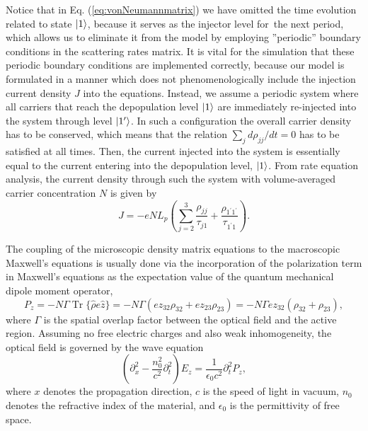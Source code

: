 \documentclass[10pt]{article}
\DeclareMathOperator{\Tr}{Tr}
\begin{document}
			Notice that in Eq. (\ref{eq:vonNeumannmatrix}) we have omitted the time
			evolution related to state $\Ket{1}$, because it serves as the injector level
			for\ the next period, which allows us to eliminate it from the model by
			employing ''periodic'' boundary conditions in the scattering rates matrix. It
			is vital for the simulation that these periodic boundary conditions are
			implemented correctly, because our model is formulated in a manner which does
			not phenomenologically include the injection current density $J$ into the
			equations. Instead, we assume a periodic system where all carriers that reach
			the depopulation level $\Ket{1}$ are immediately re-injected into the system
			through level $\Ket{1'}$. In such a configuration the overall carrier density
			has to be conserved, which means that the relation $\sum_{j}d\rho_{jj}/dt=0$
			has to be satisfied at all times. Then, the current injected into the system
			is essentially equal to the current entering into the depopulation level,
			$\Ket{1}$. From rate equation analysis, the current density through such the
			system with volume-averaged carrier concentration $N$ is given by
			\cite{kumar2009coherence}
			\begin{equation}
				J=-eNL_{p}\left(  \sum_{j=2}^{3}\frac{\rho_{jj}}{\tau_{j1}}+\frac
				{\rho_{1^{\prime}1^{\prime}}}{\tau_{1^{\prime}1}}\right)  .
			\end{equation}
			
			The coupling of the microscopic density matrix equations to the macroscopic
			Maxwell's equations is usually done via the incorporation of the polarization
			term in Maxwell's equations as the expectation value of the quantum mechanical
			dipole moment operator,
			\begin{equation}
				P_{z}=-N\Gamma\Tr\{\hat{\rho}e\hat{z}\}=-N\Gamma(ez_{32}\rho_{32}+ez_{23}%
				\rho_{23})=-N\Gamma ez_{32}(\rho_{32}+\rho_{23}), \label{eq:fullpolarization}%
			\end{equation}
			where $\Gamma$ is the spatial overlap factor between the optical field and the
			active region. Assuming no free electric charges and also weak inhomogeneity,
			the optical field is governed by the wave equation
			\cite{boyd2003nonlinear,jirauschek2014modeling}
			\begin{equation}
				\left(  \partial_{x}^{2}-\frac{n_{0}^{2}}{c^{2}}\partial_{t}^{2}\right)
				E_{z}=\frac{1}{\epsilon_{0}c^{2}}\partial_{t}^{2}P_{z}, \label{eq:fullwave}%
			\end{equation}
			where $x$ denotes the propagation direction, $c$ is the speed of light in
			vacuum, $n_{0}$ denotes the refractive index of the material, and
			$\epsilon_{0}$ is the permittivity of free space. 
				
\end{document}
